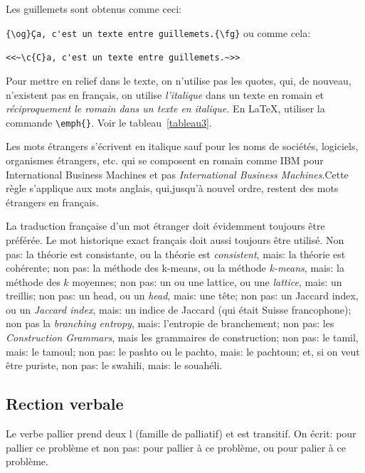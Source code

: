 \documentclass[utf8x]{article-hermes_frenchb}
\begin{document}
Les guillemets sont obtenus comme ceci:
{\verb+{\og}Ça, c'est un texte entre guillemets.{\fg}+
ou comme cela:
{\verb+<<~\c{C}a, c'est un texte entre guillemets.~>>+

Pour mettre en relief dans le texte, on n'utilise pas les quotes,
qui, de nouveau, n'existent pas en français,
on utilise \emph{l'italique} dans un texte en romain et
\emph{réciproquement \emph{le romain} dans un texte en italique.}
En \LaTeX, utiliser la commande \verb+\emph{}+.
Voir le tableau~\ref{tableau3}.

Les mots étrangers s'écrivent en italique sauf pour les noms de sociétés, logiciels, organismes étrangers, etc. qui se composent en romain comme IBM pour International Business Machines et pas \emph{International Business Machines}.Cette règle s'applique aux mots anglais, qui,jusqu'à nouvel ordre, restent des mots étrangers en français. 

La traduction française d'un mot étranger doit évidemment toujours être préférée.
Le mot historique exact français doit aussi toujours être utilisé.
Non pas:
la théorie est consistante,
ou
la théorie est \emph{consistent},
mais:
la théorie est cohérente;
non pas:
la méthode des k-means,
ou la méthode \emph{k-means},
mais:
la méthode des $k$ moyennes;
non pas:
un ou une lattice,
ou une \emph{lattice},
mais:
un treillis;
non pas:
un head,
ou un \emph{head},
mais:
une tête;
non pas:
un Jaccard index,
ou
un \emph{Jaccard index},
mais:
un indice de Jaccard (qui était Suisse francophone);
non pas la \emph{branching entropy},
mais:
l'entropie de branchement;
non pas:
les \emph{Construction Grammars},
mais les grammaires de construction;
non pas: le tamil,
mais:
le tamoul;
non pas: le pashto ou le pachto,
mais:
le pachtoun;
et, si on veut être puriste,
non pas:
le swahili,
mais:
le souahéli.


\subsection{Rection verbale}

Le verbe pallier prend deux l (famille de palliatif) et est transitif.
On écrit:
pour pallier ce problème
et non pas:
pour pallier à ce problème,
ou
pour palier à ce problème.

}}
\end{document}
